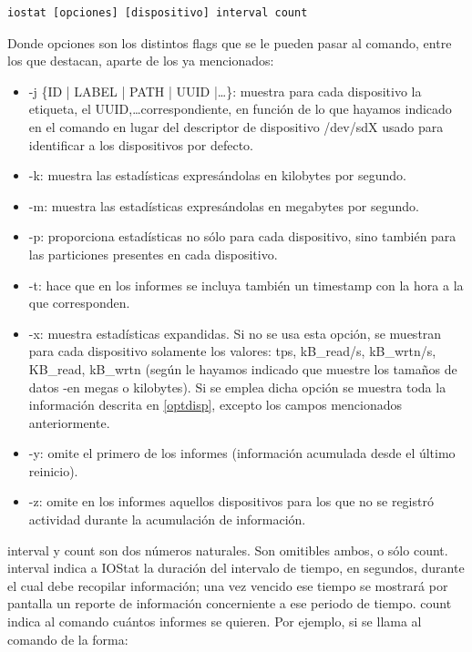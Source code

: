 \documentclass[a4paper,10pt]{article}
\renewcommand{\texttt}[2][black!60]{\textcolor{#1}{\ttfamily #2}}
\begin{document}
  \begin{lstlisting}[style=BashInputStyle]
  iostat [opciones] [dispositivo] interval count
  \end{lstlisting}
  
  Donde \texttt{opciones} son los distintos flags que se le pueden pasar al comando, entre los que destacan, aparte de los ya
  mencionados:
  
  \begin{itemize}
   \item \texttt{-j \{ID | LABEL | PATH | UUID |\ldots\}}: muestra para cada dispositivo la etiqueta, el UUID,\ldots correspondiente,
   en función de lo que hayamos indicado en el comando en lugar del descriptor de dispositivo \texttt{/dev/sdX} usado para identificar a los dispositivos
   por defecto.
   \item \texttt{-k}: muestra las estadísticas expresándolas en kilobytes por segundo.
   \item \texttt{-m}: muestra las estadísticas expresándolas en megabytes por segundo.
   \item \texttt{-p}: proporciona estadísticas no sólo para cada dispositivo, sino también para las particiones presentes en cada
   dispositivo.
   \item \texttt{-t}: hace que en los informes se incluya también un timestamp con la hora a la que corresponden.
   \item \texttt{-x}: muestra estadísticas expandidas. Si no se usa esta opción, se muestran para cada dispositivo solamente
   los valores: \texttt{tps, kB\_read/s, kB\_wrtn/s, KB\_read, kB\_wrtn} (según le hayamos indicado que muestre los
   tamaños de datos -en megas o kilobytes). Si se emplea dicha opción se muestra toda la
   información descrita en \ref{optdisp}, excepto los campos mencionados anteriormente.
   \item \texttt{-y}: omite el primero de los informes (información acumulada desde el último reinicio).
   \item \texttt{-z}: omite en los informes aquellos dispositivos para los que no se registró actividad durante la acumulación
   de información.
  \end{itemize}

\texttt{interval} y \texttt{count} son dos números naturales. Son omitibles ambos, o sólo \texttt{count}. \texttt{interval} indica
a IOStat la duración del intervalo de tiempo, en segundos, durante el cual debe recopilar información; una vez vencido
ese tiempo se mostrará por pantalla un reporte de información concerniente a ese periodo de tiempo. \texttt{count} indica al comando
cuántos informes se quieren. Por ejemplo, si se llama al comando de la forma:
\end{document}
